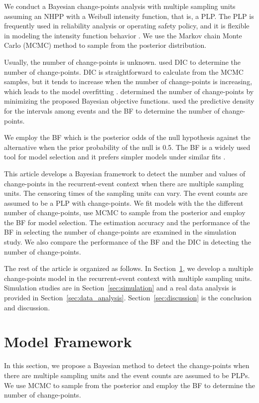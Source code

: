 \documentclass[12pt]{article}
\numberwithin{equation}{section}
\begin{document}
We conduct a Bayesian change-points analysis with multiple sampling units assuming an NHPP with a Weibull intensity function, that is, a PLP. The PLP is frequently used in reliability analysis or operating safety policy, and it is flexible in modeling the intensity function behavior \citep{Crow1975}. We use the Markov chain Monte Carlo (MCMC) method to sample from the posterior distribution. 

Usually, the number of change-points is unknown. \citet{Cruz2016, Achcar2016} used  DIC to determine the number of change-points. DIC is straightforward to calculate from the MCMC samples, but it tends to increase when the number of change-points is increasing, which leads to the model overfitting \citep{Ando2010}. \citet{Montoya2017} determined the number of change-points by minimizing the proposed Bayesian objective functions. \citet{Achcar2007} used the predictive density for the intervals among events and the BF to determine the number of change-points. 
 
We employ the BF which is the posterior odds of the null hypothesis against the alternative when the prior probability of the null is 0.5. The BF is a widely used tool for model selection and it prefers simpler models under similar fits \citep{Kass1995}. 

This article develops a Bayesian framework to detect the number and values of change-points in the recurrent-event context when there are multiple sampling units. The censoring times of the sampling units can vary.  The event counts are assumed to be a PLP with change-points. We fit models with the the different number of change-points, use MCMC to sample from the posterior and employ the BF for model selection. The estimation accuracy and the performance of the BF in selecting the number of change-points are examined in the simulation study.  We also compare the performance of the BF and the DIC in detecting the number of change-points.

The rest of the article is organized as follows. In Section~\ref{sec:models}, we develop a multiple change-points model in the recurrent-event context with multiple sampling units. Simulation studies are in Section~\ref{sec:simulation} and a real data analysis is provided in Section~\ref{sec:data_analysis}. Section~\ref{sec:discussion} is the conclusion and discussion. %

\section{Model Framework}\label{sec:models}
In this section, we propose a Bayesian method to detect the change-points when there are multiple sampling units and the event counts are assumed to be PLPs. We use MCMC to sample from the posterior and employ the BF to determine the number of change-points. 
\end{document}
